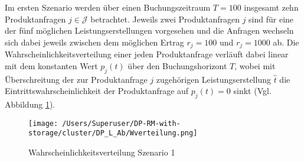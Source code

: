 Im ersten Szenario werden über einen Buchungszeitraum $T=100$ insgesamt zehn Produktanfragen $j\in\mathcal{J}$ betrachtet. Jeweils zwei Produktanfragen $j$ sind für eine der fünf möglichen Leistungserstellungen vorgesehen und die Anfragen wechseln sich dabei jeweils zwischen dem möglichen Ertrag $r_j=100$ und $r_j=1000$ ab. Die Wahrscheinlichkeitsverteilung einer jeden Produktanfrage verläuft dabei linear mit dem konstanten Wert $p_j(t)$ über den Buchungshorizont $T$, wobei mit Überschreitung der zur Produktanfrage $j$ zugehörigen Leistungserstellung $\hat t$ die Eintrittswahrscheinlichkeit der Produktanfrage auf $p_j(t)=0$ sinkt (Vgl. Abbildung \ref{SB1}).

\begin{figure}[h!]
  \begin{center}
    \texttt{[image: /Users/Superuser/DP-RM-with-storage/cluster/DP\_L\_Ab/Wverteilung.png]}
    \caption{Wahrscheinlichkeitsverteilung Szenario 1}  \label{SB1}
  \end{center}
\end{figure}

